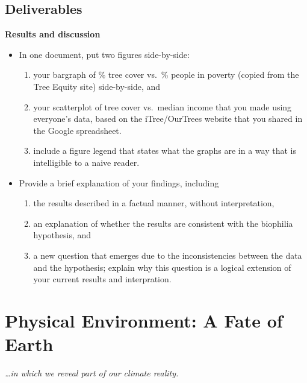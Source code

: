 \documentclass[
  letterpaper,
  DIV=11,
  numbers=noendperiod]{scrreprt}
\providecommand{\tightlist}{%
  \setlength{\itemsep}{0pt}\setlength{\parskip}{0pt}}
\begin{document}
\section{Deliverables}\label{deliverables-2}

\textbf{Results and discussion}

\begin{itemize}
\tightlist
\item
  In one document, put two figures side-by-side:

  \begin{enumerate}
  \def\labelenumi{\roman{enumi}.}
  \tightlist
  \item
    your bargraph of \% tree cover vs.~\% people in poverty (copied from
    the Tree Equity site) side-by-side, and
  \item
    your scatterplot of tree cover vs.~median income that you made using
    everyone's data, based on the iTree/OurTrees website that you shared
    in the Google spreadsheet.
  \item
    include a figure legend that states what the graphs are in a way
    that is intelligible to a naive reader.
  \end{enumerate}
\item
  Provide a brief explanation of your findings, including

  \begin{enumerate}
  \def\labelenumi{\roman{enumi}.}
  \tightlist
  \item
    the results described in a factual manner, without interpretation,
  \item
    an explanation of whether the results are consistent with the
    biophilia hypothesis, and
  \item
    a new question that emerges due to the inconsistencies between the
    data and the hypothesis; explain why this question is a logical
    extension of your current results and interpration.
  \end{enumerate}
\end{itemize}


\chapter{Physical Environment: A Fate of
Earth}\label{physical-environment-a-fate-of-earth}

\emph{\ldots in which we reveal part of our climate reality.}
\end{document}
